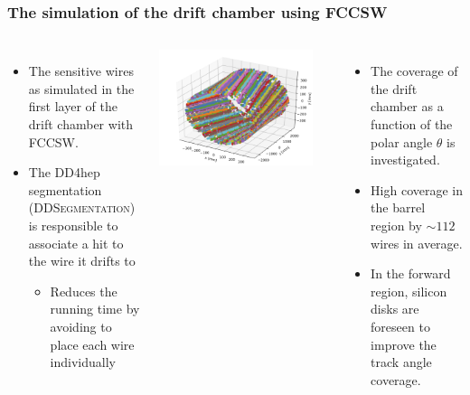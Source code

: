 \documentclass[aspectratio=169, hyperref={colorlinks=true,pdfpagelabels=false,linkcolor=black}, xcolor=dvipsnames,10pt]{beamer}
\begin{document}
\begin{frame}
  \centering

\end{frame}

\begin{frame}
  \frametitle{The simulation of the drift chamber using FCCSW}


  \begin{columns}
    \begin{itemize}
      \item The sensitive wires as simulated in the first layer of the drift chamber with FCCSW.
      \item The DD4hep segmentation (\textsc{DDSegmentation}) is responsible to associate a hit to the wire it drifts to
        \begin{itemize}
          \item Reduces the running time by avoiding to place each wire individually
        \end{itemize}
    \end{itemize}

    \centering
    \includegraphics[width=0.9\textwidth]{figures/allHits}

    \begin{itemize}
      \item The coverage of the drift chamber as a function of the polar angle $\theta$ is investigated.
      \item High coverage in the barrel region by $\sim 112$ wires in average.
      \item In the forward region, silicon disks are foreseen to improve the track angle coverage.
    \end{itemize}


\end{columns}
\end{frame}
\end{document}

